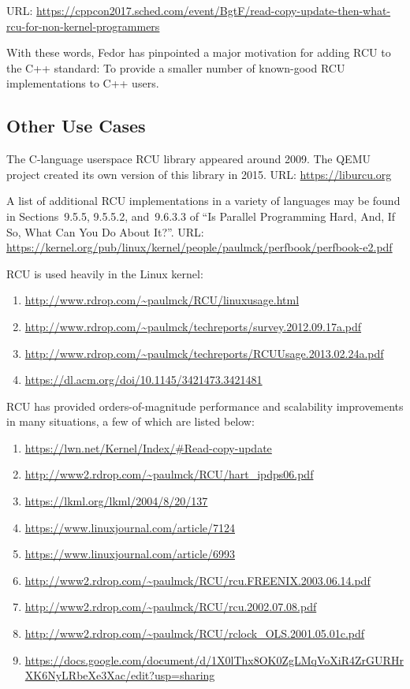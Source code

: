 URL: {\scriptsize \url{https://cppcon2017.sched.com/event/BgtF/read-copy-update-then-what-rcu-for-non-kernel-programmers}}

With these words, Fedor has pinpointed a major motivation for adding
RCU to the C++ standard: To provide a smaller number of known-good RCU
implementations to C++ users.

\subsection{Other Use Cases}
\label{sec:Other Use Cases}

The C-language userspace RCU library appeared around 2009.
The QEMU project created its own version of this library in 2015.
URL: \url{https://liburcu.org}

A list of additional RCU implementations in a variety of languages
may be found in Sections~9.5.5, 9.5.5.2, and~9.6.3.3 of
``Is Parallel Programming Hard, And, If So, What Can You Do About It?''.
URL: \url{https://kernel.org/pub/linux/kernel/people/paulmck/perfbook/perfbook-e2.pdf}

RCU is used heavily in the Linux kernel:

\begin{enumerate}
\item	\url{http://www.rdrop.com/~paulmck/RCU/linuxusage.html}
\item	\url{http://www.rdrop.com/~paulmck/techreports/survey.2012.09.17a.pdf}
\item	\url{http://www.rdrop.com/~paulmck/techreports/RCUUsage.2013.02.24a.pdf}
\item	\url{https://dl.acm.org/doi/10.1145/3421473.3421481}
\end{enumerate}

RCU has provided orders-of-magnitude performance and scalability
improvements in many situations, a few of which are listed below:

\begin{enumerate}
\item	\url{https://lwn.net/Kernel/Index/#Read-copy-update}
\item	\url{http://www2.rdrop.com/~paulmck/RCU/hart_ipdps06.pdf}
\item	\url{https://lkml.org/lkml/2004/8/20/137}
\item	\url{https://www.linuxjournal.com/article/7124}
\item	\url{https://www.linuxjournal.com/article/6993}
\item	\url{http://www2.rdrop.com/~paulmck/RCU/rcu.FREENIX.2003.06.14.pdf}
\item	\url{http://www2.rdrop.com/~paulmck/RCU/rcu.2002.07.08.pdf}
\item	\url{http://www2.rdrop.com/~paulmck/RCU/rclock_OLS.2001.05.01c.pdf}
\item	\url{https://docs.google.com/document/d/1X0lThx8OK0ZgLMqVoXiR4ZrGURHrXK6NyLRbeXe3Xac/edit?usp=sharing}
\end{enumerate}

